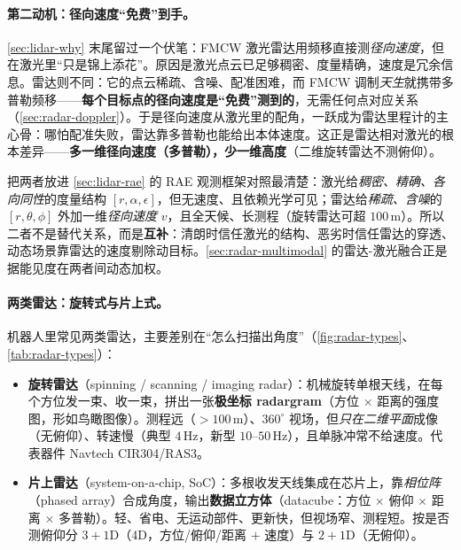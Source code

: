 \paragraph{第二动机：径向速度“免费”到手。}
\cref{sec:lidar-why} 末尾留过一个伏笔：FMCW 激光雷达用频移直接测\emph{径向速度}，但在激光里“只是锦上添花”。原因是激光点云已足够稠密、度量精确，速度是冗余信息。雷达则不同：它的点云稀疏、含噪、配准困难，而 FMCW 调制\emph{天生}就携带多普勒频移——\textbf{每个目标点的径向速度是“免费”测到的}，无需任何点对应关系（\cref{sec:radar-doppler}）。于是径向速度从激光里的配角，一跃成为雷达里程计的主心骨：哪怕配准失败，雷达靠多普勒也能给出本体速度。这正是雷达相对激光的根本差异——\textbf{多一维径向速度（多普勒），少一维高度}（二维旋转雷达不测俯仰）。

\begin{insight}\label{ins:radar-vs-lidar}
把两者放进 \cref{sec:lidar-rae} 的 RAE 观测框架对照最清楚：激光给\emph{稠密、精确、各向同性}的度量结构 $[r,\alpha,\epsilon]$，但无速度、且依赖光学可见；雷达给\emph{稀疏、含噪}的 $[r,\theta,\phi]$ 外加一维\emph{径向速度} $v$，且全天候、长测程（旋转雷达可超 $100$\,m）。所以二者不是替代关系，而是\textbf{互补}：清朗时信任激光的结构、恶劣时信任雷达的穿透、动态场景靠雷达的速度剔除动目标。\cref{sec:radar-multimodal} 的雷达-激光融合正是据能见度在两者间动态加权。
\end{insight}

\paragraph{两类雷达：旋转式与片上式。}
机器人里常见两类雷达，主要差别在“怎么扫描出角度”（\cref{fig:radar-types}、\cref{tab:radar-types}）\cite{carlone2026handbook}：
\begin{itemize}
  \item \textbf{旋转雷达}（spinning / scanning / imaging radar）：机械旋转单根天线，在每个方位发一束、收一束，拼出一张\textbf{极坐标 radargram}（方位 $\times$ 距离的强度图，形如鸟瞰图像）。测程远（$>100$\,m）、$360^\circ$ 视场，但\emph{只在二维平面}成像（无俯仰）、转速慢（典型 $4$\,Hz，新型 $10$--$50$\,Hz），且单脉冲常不给速度。代表器件 Navtech CIR304/RAS3。
  \item \textbf{片上雷达}（system-on-a-chip, SoC）：多根收发天线集成在芯片上，靠\emph{相位阵}（phased array）合成角度，输出\textbf{数据立方体}（datacube：方位 $\times$ 俯仰 $\times$ 距离 $\times$ 多普勒）。轻、省电、无运动部件、更新快，但视场窄、测程短。按是否测俯仰分 $3{+}1$D（4D，方位/俯仰/距离 $+$ 速度）与 $2{+}1$D（无俯仰）。
\end{itemize}

